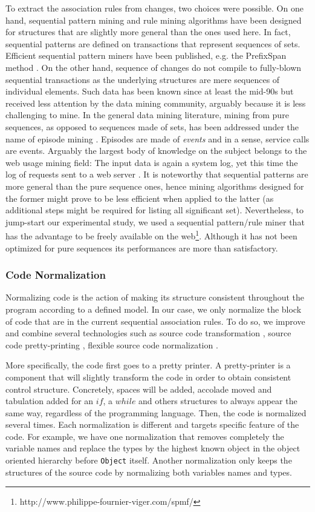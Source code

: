 To extract the association rules from changes,
two choices were possible. On one hand, sequential pattern mining and rule mining algorithms
have been designed for structures that are slightly more general than the ones used here.
In fact, sequential patterns are defined on transactions that represent sequences of sets.
Efficient sequential pattern miners have been published, e.g. the PrefixSpan method \cite{Pei2004}.
On the other hand, sequence of changes do not compile to fully-blown sequential transactions as the underlying structures are mere sequences of individual elements. Such data has been known since at least the mid-90s but received less attention by the data mining community, arguably because it is less challenging to mine. In the general data mining literature, mining from pure sequences, as opposed to sequences made of sets, has been addressed under the name of episode mining \cite{HEIKKI1997}. Episodes are made of \textit{events} and in a sense, service calls are events. Arguably the largest body of knowledge on the subject belongs to the web usage mining field: The input data is again a system log, yet this time the log of requests sent to a web server \cite{Pei2000}.
It is noteworthy that sequential patterns are more general than the pure sequence ones, hence mining algorithms designed for the former might prove to be less efficient when applied to the latter (as additional steps might be required for listing all significant set).
Nevertheless, to jump-start our experimental study, we used a sequential pattern/rule miner that has the advantage to be freely available on the web\footnote{http://www.philippe-fournier-viger.com/spmf/}. Although it has not been optimized for pure sequences its performances are more than satisfactory.

\subsubsection{Code Normalization\label{sec:resemble-normalization}}

Normalizing code is the action of making its structure consistent throughout the program according to a defined model. In our case, we only normalize the block of code that are in the current sequential association rules. To do so, we improve and combine several technologies such as source code transformation \cite{Cordy2006,Cordy2006a}, source code pretty-printing \cite{Roy2008}, flexible source code normalization \cite{Cordy2011}.

More specifically, the code first goes to a pretty printer. A pretty-printer is a component that will slightly transform the code in order to obtain consistent control structure.
Concretely, spaces will be added, accolade moved and tabulation added for an $if$, a $while$ and others structures to always appear the same way, regardless of the programming language.
Then, the code is normalized several times. Each normalization is different and targets specific feature of the code.
For example, we have one normalization that removes completely the variable names and replace the types by the highest known object in the object oriented hierarchy before {\tt Object} itself. Another normalization only keeps the structures of the source code by normalizing both variables names and types.

